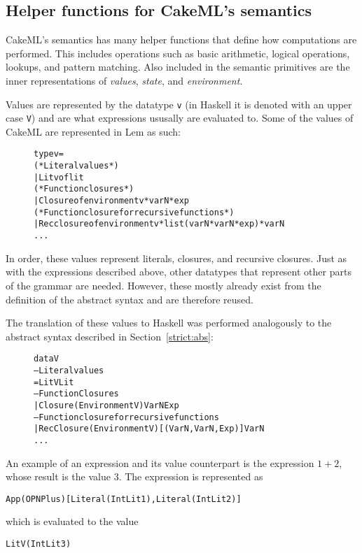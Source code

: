 \subsection{Helper functions for CakeML's semantics}
CakeML's semantics has many helper functions that define how computations are
performed. This includes operations such as basic arithmetic, logical
operations, lookups, and pattern matching. Also included in the semantic
primitives are the inner representations of \textit{values}, \textit{state}, and
\textit{environment}.

Values are represented by the datatype \texttt{v} (in Haskell it is denoted with
an upper case \texttt{V}) and are what expressions
ususally are evaluated to. Some of the values of CakeML are represented in
Lem as such:

\begin{figure}[H]
\begin{alltt}
  type v =
    (* Literal values *)
    | Litv of lit
    (* Function closures *)
    | Closure of environment v * varN * exp
    (* Function closure for recursive functions *)
    | Recclosure of environment v * list (varN * varN * exp) * varN
    ...
\end{alltt}
\end{figure}

\noindent In order, these values represent literals, closures, and recursive closures.
Just as with the expressions described above, other datatypes that represent
other parts of the grammar are needed. However, these mostly already exist from
the definition of the abstract syntax and are therefore reused.

The translation of these values to Haskell was performed analogously to the
abstract syntax described in Section~\ref{strict:abs}:

\begin{figure}[H]
\begin{alltt}
  data V
    -- Literal values
    = LitV Lit
    -- Function Closures
    | Closure (Environment V) VarN Exp
    -- Function closure for recursive functions
    | RecClosure (Environment V) [(VarN, VarN, Exp)] VarN
    ...
\end{alltt}
\end{figure}

An example of an expression and its value counterpart is the expression $1 + 2$,
whose result is the value 3. The expression is represented as
\begin{alltt}
  App (OPN Plus) [Literal (IntLit 1), Literal (IntLit 2)]
\end{alltt}
which is evaluated to the value
\begin{alltt}
  LitV (IntLit 3)
\end{alltt}


